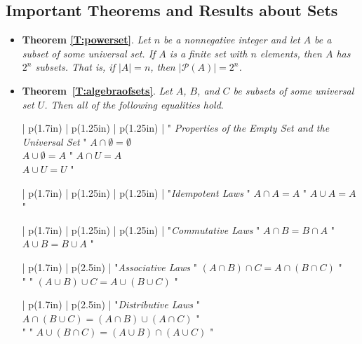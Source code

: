\subsection*{Important Theorems and Results about Sets} \label{SS:setresults}
%
\begin{itemize}
\item \textbf{Theorem \ref{T:powerset}}.  
\emph{Let  $n$  be a nonnegative integer and let  $A$  be a subset of some universal set.  If  $A$  is a finite set with  $n$  elements, then  $A$  has  $2^n $ subsets.  That is,  if  $\left| A \right| = n$, then  $\left| {\mathcal{P}\left( A \right)} \right| = 2^n $.}

\item \textbf{Theorem~\ref{T:algebraofsets}}.
\emph{Let  $A$, $B$, and  $C$  be subsets of some universal set  $U$\!.  Then all of the following equalities hold}.

\noindent
\BeginTable
\def\L{\JustLeft}
\BeginFormat
| p(1.7in) | p(1.25in) | p(1.25in) |
\EndFormat
" \emph{Properties of the Empty Set
%
 and the Universal Set}
 " %
$A \cap \emptyset  = \emptyset$ \\    
$A \cup \emptyset  = A$ 
" 
$A \cap U = A$ \\       
$A \cup U = U$ 
" \\
\EndTable

\noindent
\BeginTable
\def\L{\JustLeft}
\BeginFormat
| p(1.7in) | p(1.25in) | p(1.25in) |
\EndFormat
"\emph{Idempotent Laws} " $A \cap A = A$ " $A \cup A = A$ " \\
\EndTable
{}%

\noindent
\BeginTable
\def\L{\JustLeft}
\BeginFormat
| p(1.7in) | p(1.25in) | p(1.25in) |
\EndFormat
"\emph{Commutative Laws} " $A \cap B = B \cap A$ " $A \cup B = B \cup A$ " \\
\EndTable
{}%

\noindent
\BeginTable
\def\L{\JustLeft}
\BeginFormat
| p(1.7in) | p(2.5in) |
\EndFormat"\emph{Associative Laws} "  \L $\left( {A \cap B} \right) \cap C = A \cap \left( {B \cap C} \right)$ " \\
"                  "  \L $\left( {A \cup B} \right) \cup C = A \cup \left( {B \cup C} \right) $ " \\
\EndTable
{}%

\noindent
\BeginTable
\def\L{\JustLeft}
\BeginFormat
| p(1.7in) | p(2.5in) |
\EndFormat"\emph{Distributive Laws} "  \L $A \cap \left( {B \cup C} \right) = \left( {A \cap B} \right) \cup \left( {A \cap C} \right)$ " \\
"                  "  \L $A \cup \left( {B \cap C} \right) = \left( {A \cup B} \right) \cap \left( {A \cup C} \right)$ " \\
\EndTable
{}%


\end{itemize}
